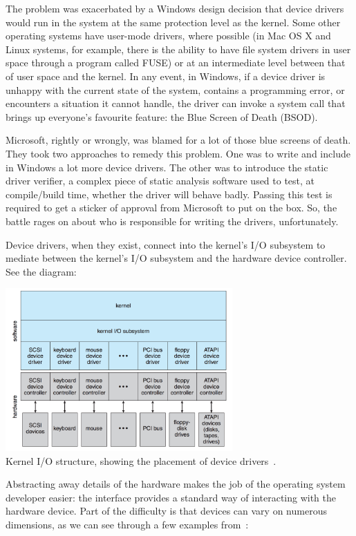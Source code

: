 The problem was exacerbated by a Windows design decision that device drivers would run in the system at the same protection level as the kernel. Some other operating systems have user-mode drivers, where possible (in Mac OS X and Linux systems, for example, there is the ability to have file system drivers in user space through a program called FUSE) or at an intermediate level between that of user space and the kernel. In any event, in Windows, if a device driver is unhappy with the current state of the system, contains a programming error, or encounters a situation it cannot handle, the driver can invoke a system call that brings up everyone's favourite feature: the Blue Screen of Death (BSOD).

Microsoft, rightly or wrongly, was blamed for a lot of those blue screens of death. They took two approaches to remedy this problem. One was to write and include in Windows a lot more device drivers. The other was to introduce the static driver verifier, a complex piece of static analysis software used to test, at compile/build time, whether the driver will behave badly. Passing this test is required to get a sticker of approval from Microsoft to put on the box. So, the battle rages on about who is responsible for writing the drivers, unfortunately.

Device drivers, when they exist, connect into the kernel's I/O subsystem to mediate between the kernel's I/O subsystem and the hardware device controller. See the diagram:

\begin{center}
	\includegraphics[width=0.65\textwidth]{images/kernel-io-structure.png}\\
	Kernel I/O structure, showing the placement of device drivers~\cite{osc}.
\end{center}

Abstracting away details of the hardware makes the job of the operating system developer easier: the interface provides a standard way of interacting with the hardware device. Part of the difficulty is that devices can vary on numerous dimensions, as we can see through a few examples from~\cite{osc}:

